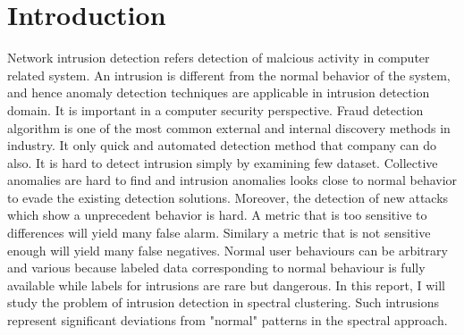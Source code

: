 \section{Introduction}
Network intrusion detection refers detection of malcious activity in computer related system. 
An intrusion is different from the normal behavior of the system, and hence anomaly detection techniques are applicable in intrusion detection domain. \cite{chandola09}
It is important in a computer security perspective. 
Fraud detection algorithm is one of the most common external and internal discovery methods in industry.
It only quick and automated detection method that company can do also.\cite{verizon14} 
It is hard to detect intrusion simply by examining few dataset. 
Collective anomalies are hard to find and intrusion anomalies looks close to normal behavior to evade the existing detection solutions\cite{chandola09}. 
Moreover, the detection of new attacks which show a unprecedent behavior is hard. 
A metric that is too sensitive to differences will yield many false alarm. Similary a metric that is not sensitive enough will yield many false negatives.
Normal user behaviours can be arbitrary and various because labeled data corresponding to normal behaviour is fully available while labels for intrusions are rare but dangerous. 
In this report, I will study the problem of intrusion detection in spectral clustering. 
Such intrusions represent significant deviations from "normal" patterns in the spectral approach. 

